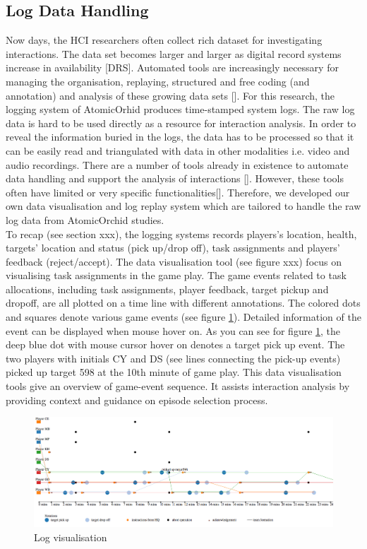 \subsection{Log Data Handling} 
Now days, the HCI researchers often collect rich dataset for investigating interactions. The data set becomes larger and larger as digital record systems increase in availability [DRS]. Automated tools are increasingly necessary for managing the organisation, replaying, structured and free coding (and annotation) and analysis of these growing data sets []. For this research, the logging system of AtomicOrhid produces time-stamped system logs. The raw log data is hard to be used directly as a resource for interaction analysis. In order to reveal the information buried in the logs, the data has to be processed so that it can be easily read and triangulated with data in other modalities i.e.  video and audio recordings. There are a number of tools already in existence to automate data handling and support the analysis of interactions []. However, these tools often have limited or very specific functionalities[]. Therefore, we developed our own data visualisation and log replay system which are tailored to handle the raw log data from AtomicOrchid studies.\\

To recap (see section xxx), the logging systems records players's location, health, targets' location and status (pick up/drop off), task assignments and players' feedback (reject/accept). The data visualisation tool (see figure xxx) focus on visualising task assignments in the game play. The game events related to task allocations, including task assignments, player feedback, target pickup and dropoff, are all plotted on a time line with different annotations. The   colored dots and squares denote various game events (see figure \ref{fig:logvis}). Detailed information of the event can be displayed when mouse hover on. As you can see for figure \ref{fig:logvis}, the deep blue dot with mouse cursor hover on denotes a target pick up event. The two players with initials CY and DS (see lines connecting the pick-up events) picked up target 598 at the 10th minute of game play. This data visualisation tools give an overview of game-event sequence. It assists interaction analysis by providing context and guidance on episode selection process. \\

\begin{figure}[h]
  \centering
  \includegraphics[width=1\textwidth]{img/methodology/logVisualisation}
  \caption{Log visualisation}
  \label{fig:logvis}
\end{figure}

